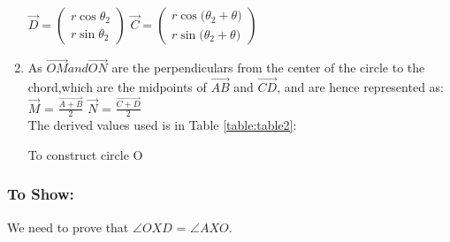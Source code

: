 \begin{enumerate}
  \quad $ \vec{D}= \begin{pmatrix}r\cos{\theta _2}\\r\sin{\theta _2}\end{pmatrix}$
  \quad $\vec{C}=\begin{pmatrix}r\cos{\big(\theta _2 + \theta\big)}\\r\sin{\big(\theta _2 + \theta\big)}\end{pmatrix}$

\item As $\vec{OM} and \vec{ON}$ are the perpendiculars from the center of the circle to the chord,which are the midpoints of $\vec{AB}$ and $\vec{CD}$, and are hence represented as:\\
  \quad $ \vec{M}$ = $\frac{\vec{A+B}}{2}$\quad
  \quad $ \vec{N}$ = $\frac{\vec{C+D}}{2}$\\ 



The derived values used is in Table \ref{table:table2}:\\
\begin{table}[ht]
    \begin{center}
    	
  \caption{To construct circle O}
   \label{table:table2}
   \end{center}	
\end{table}

















\end{enumerate}

\subsubsection*{To Show:}    We need to prove that $\angle{OXD}$ = $\angle{AXO}$.\\
